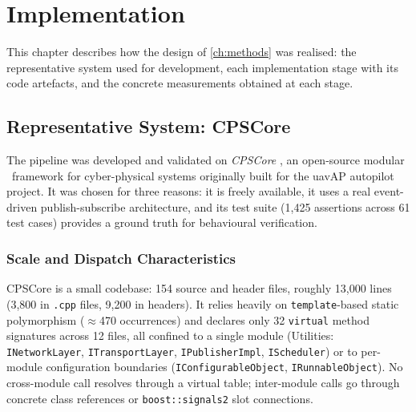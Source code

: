 \chapter{Implementation}\label{ch:experiments}

This chapter describes how the design of \cref{ch:methods} was realised:
the representative system used for development, each implementation
stage with its code artefacts, and the concrete measurements obtained at
each stage.

\section{Representative System: CPSCore}\label{sec:cpscoreintro}

The pipeline was developed and validated on \emph{CPSCore}
\cite{theile:cpscore}, an open-source modular \Cpp\ framework for
cyber-physical systems originally built for the uavAP autopilot project.
It was chosen for three reasons: it is freely available, it uses a real
event-driven publish-subscribe architecture, and its test suite (1,425
assertions across 61 test cases) provides a ground truth for
behavioural verification.

\subsection{Scale and Dispatch Characteristics}\label{sec:cpscore-scale}

CPSCore is a small codebase: 154 source and header files, roughly
13,000 lines (3,800 in \texttt{.cpp} files, 9,200 in headers). It relies
heavily on \texttt{template}-based static polymorphism ($\approx$470
occurrences) and declares only 32 \texttt{virtual} method signatures
across 12 files, all confined to a single module (Utilities:
\texttt{INetworkLayer}, \texttt{ITransportLayer}, \texttt{IPublisherImpl},
\texttt{IScheduler}) or to per-module configuration boundaries
(\texttt{IConfigurableObject}, \texttt{IRunnableObject}). No
cross-module call resolves through a virtual table; inter-module calls
go through concrete class references or \texttt{boost::signals2} slot
connections.

